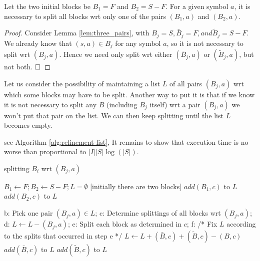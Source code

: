 \begin{lemma}
	Let the two initial blocks be $B_1=F$ and $B_2=S-F$. For a given
	symbol $a$, it is necessary to split all blocks wrt only one of the pairs $(B_1, a)$ and $(B_2, a)$.
\end{lemma}

\begin{proof}
	Consider Lemma \ref{lem:three_pairs}, with $B_j=S, \bar{B}_j =F, and \tilde{B}_j=S-F$. We already know that $(s, a)\in B_j$ for any symbol $a$, so it is not necessary to split wrt $(B_j, a)$.
	Hence we need only split wrt either $(\bar{B}_j, a)$ or $(\tilde{B}_j, a)$, but not both. $\hfill\square$
\end{proof}

Let us consider the possibility of maintaining a list $L$ of all pairs $(B_j, a)$ wrt which some blocks may have to be split. Another way to put it is that if we know it is not necessary to split any $B$ (including $B_j$ itself) wrt a pair $(B_j, a)$ we won't put that pair on the list. We can then keep splitting until the list $L$ becomes empty.

see Algorithm \ref{alg:refinement-list}, It remains to show that execution time is no worse than proportional to $|I||S|\log(|S|)$.

\begin{algorithm}  
	\caption{splitting $B_i$ wrt $(B_j, a)$} 
	\label{alg:refinement-list} 
	\begin{algorithmic}%
		\State $B_1 \gets F; B_2\gets S-F; L=\emptyset$  [initially there are two blocks]  
				\State $add(B_1,c)$ to $L$
			\Else
				\State $add(B_2,c)$ to $L$
	        \EndIf
		\EndFor
		
			\State b: Pick one pair $(B_j,a)\in L$;
			\State c: Determine splittings of all blocks wrt $(B_j,a)$;
			\State d: $L\gets L-(B_j,a)$;
			\State e: Split each block as determined in $c$;
			\State f: /* Fix $L$ according to the splits that occurred in step e */
						\State $L\gets L+(\bar{B},c)+(\tilde{B},c)-(B,c)$
					\Else
							\State $add(\bar{B},c)$ to $L$
						\Else
							\State $add(\tilde{B},c)$ to $L$
						\EndIf
					\EndIf
				\EndFor
			\EndFor
		\EndWhile
	\end{algorithmic}   
\end{algorithm}

